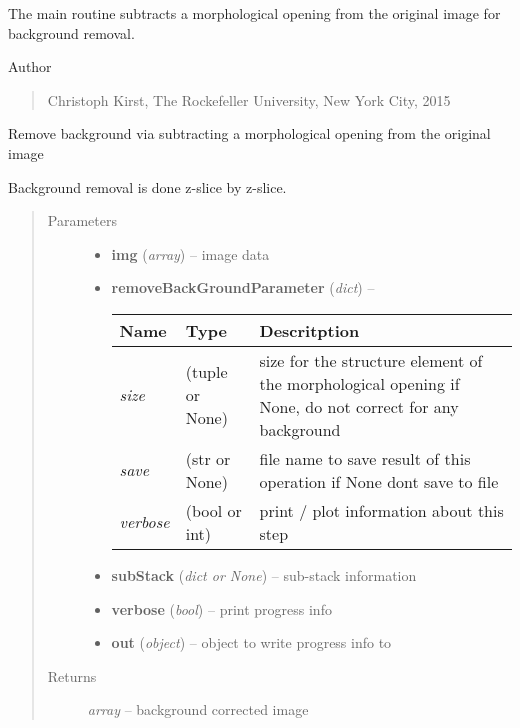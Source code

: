 \documentclass[letterpaper,10pt,english]{sphinxmanual}
\begin{document}
The main routine subtracts a morphological opening from the original image
for background removal.

Author
\begin{quote}

Christoph Kirst, The Rockefeller University, New York City, 2015
\end{quote}

\begin{fulllineitems}
\label{api/ClearMap.ImageProcessing:ClearMap.ImageProcessing.BackgroundRemoval.removeBackground}
Remove background via subtracting a morphological opening from the original image

Background removal is done z-slice by z-slice.
\begin{quote}\begin{description}
\item[{Parameters}] \leavevmode\begin{itemize}
\item {} 
\textbf{img} (\emph{array}) --
image data

\item {} 
\textbf{removeBackGroundParameter} (\emph{dict}) --

\begin{tabulary}{\linewidth}{|L|L|L|}
\hline
\textsf{\relax 
Name
} & \textsf{\relax 
Type
} & \textsf{\relax 
Descritption
}\\
\hline
\emph{size}
 & 
(tuple or None)
 & 
size for the structure element of the morphological opening
if None, do not correct for any background
\\
\hline
\emph{save}
 & 
(str or None)
 & 
file name to save result of this operation
if None dont save to file
\\
\hline
\emph{verbose}
 & 
(bool or int)
 & 
print / plot information about this step
\\
\hline\end{tabulary}


\item {} 
\textbf{subStack} (\emph{dict or None}) --
sub-stack information

\item {} 
\textbf{verbose} (\emph{bool}) --
print progress info

\item {} 
\textbf{out} (\emph{object}) --
object to write progress info to

\end{itemize}

\item[{Returns}] \leavevmode
\emph{array} --
background corrected image

\end{description}\end{quote}

\end{fulllineitems}
\end{document}
